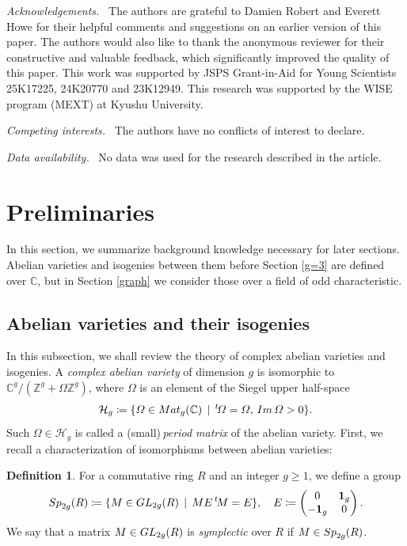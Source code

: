 \documentclass{amsart}
\theoremstyle{definition}
\newtheorem{Def}{Definition}[section]
\theoremstyle{plain}
\begin{document}
\noindent\emph{Acknowledgements.}
\ The authors are grateful to Damien Robert and Everett Howe for their helpful comments and suggestions on an earlier version of this paper.
The authors would also like to thank the anonymous reviewer for their constructive and valuable feedback, which significantly improved the quality of this paper.
This work was supported by JSPS Grant-in-Aid for Young Scientists 25K17225, 24K20770 and 23K12949.
This research was supported by the WISE program (MEXT) at Kyushu University.\smallskip

\noindent\emph{Competing interests.}
\ The authors have no conflicts of interest to declare.\smallskip

\noindent\emph{Data availability.}
\ No data was used for the research described in the article.

\section{Preliminaries}\label{preliminaries}
In this section, we summarize background knowledge necessary for later sections.
Abelian varieties and isogenies between them before Section \ref{g=3} are defined over $\mathbb{C}$, but in Section \ref{graph} we consider those over a field of odd characteristic.

\subsection{Abelian varieties and their isogenies}
In this subsection, we shall review the theory of complex abelian varieties and isogenies.
A \emph{complex abelian variety} of dimension $g$ is isomorphic to $\mathbb{C}^g/(\mathbb{Z}^g + \varOmega\mathbb{Z}^g)$, where $\varOmega$ is an element of the Siegel upper half-space\vspace{-0.5mm}
\[
    \mathcal{H}_g \coloneqq \{\varOmega \in {\rm Mat}_g(\mathbb{C})\,\mid{\,}^t\!\varOmega = \varOmega,\,{\rm Im}\,\varOmega > 0\}.\medskip
\]
Such $\varOmega \in \mathcal{H}_g$ is called a (small)\,\emph{period matrix} of the abelian variety.
First, we recall a characterization of isomorphisms between abelian varieties:
\begin{Def}
For a commutative ring $R$ and an integer $g \geq 1$, we define a group\smallskip
\[
    {\rm Sp}_{2g}(R) \coloneqq \{M \in {\rm GL}_{2g}(R)\,\mid\,ME{\,}^t\!M = E\}, \quad E \coloneqq
    \begin{pmatrix}
        0 & {\mathbf 1}_g\\
        -{\mathbf 1}_g & 0
    \end{pmatrix}.\smallskip
\]
We say that a matrix $M \in {\rm GL}_{2g}(R)$ is \emph{symplectic} over $R$ if $M \in {\rm Sp}_{2g}(R)$.
\end{Def}\smallskip
\end{document}
